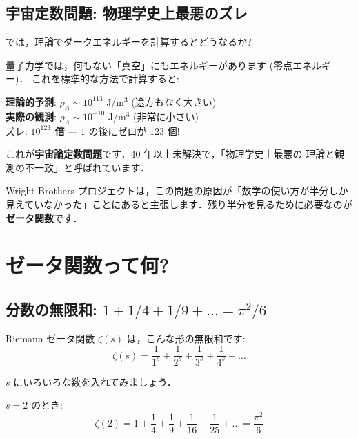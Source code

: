 \documentclass[11pt,a4paper]{article}
\begin{document}
\subsection{宇宙定数問題: 物理学史上最悪のズレ}

では，理論でダークエネルギーを計算するとどうなるか?

量子力学では，何もない「真空」にもエネルギーがあります (零点エネルギー)．
これを標準的な方法で計算すると:

\begin{tcolorbox}[colback=red!5,colframe=red!50!black]
\textbf{理論的予測}: $\rho_\Lambda \sim 10^{113}$ J/m$^3$ (途方もなく大きい)\\
\textbf{実際の観測}: $\rho_\Lambda \sim 10^{-10}$ J/m$^3$ (非常に小さい)\\[0.5em]
ズレ: \textbf{$10^{123}$ 倍} --- $1$ の後にゼロが $123$ 個!
\end{tcolorbox}

これが\textbf{宇宙論定数問題}です．40 年以上未解決で，「物理学史上最悪の
理論と観測の不一致」と呼ばれています．

Wright Brothers プロジェクトは，この問題の原因が「数学の使い方が半分しか
見えていなかった」ことにあると主張します．残り半分を見るために必要なのが
\textbf{ゼータ関数}です．

\section{ゼータ関数って何?}

\subsection{分数の無限和: $1 + 1/4 + 1/9 + \ldots = \pi^2/6$}

Riemann ゼータ関数 $\zeta(s)$ は，こんな形の無限和です:
\begin{equation*}
\zeta(s) = \frac{1}{1^s} + \frac{1}{2^s} + \frac{1}{3^s} + \frac{1}{4^s} + \ldots
\end{equation*}

$s$ にいろいろな数を入れてみましょう．

$s = 2$ のとき:
\begin{equation*}
\zeta(2) = 1 + \frac{1}{4} + \frac{1}{9} + \frac{1}{16} + \frac{1}{25} + \ldots = \frac{\pi^2}{6}
\end{equation*}
\end{document}
